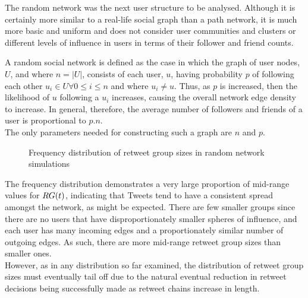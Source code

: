 The random network was the next user structure to be analysed. Although it is certainly more similar to a real-life social graph than a path network, it is much more basic and uniform and does not consider user communities and clusters or different levels of influence in users in terms of their follower and friend counts.

A random social network is defined as the case in which the graph of user nodes, $U$, and where $n = |U|$, consists of each user, $u$, having probability $p$ of following each other $u_i \in U \forall 0 \leq i \leq n$ and where $u_i \neq u$. Thus, as $p$ is increased, then the likelihood of $u$ following a $u_i$ increases, causing the overall network edge density to increase. In general, therefore, the average number of followers and friends of a user is proportional to $p.n$.\\
The only parameters needed for constructing such a graph are $n$ and $p$.

\begin{figure}[h]
\centering
{}
\caption{Frequency distribution of retweet group sizes in random network simulations}
\label{fig:random}
\end{figure}

The frequency distribution demonstrates a very large proportion of mid-range values for $RG(t)$, indicating that Tweets tend to have a consistent spread amongst the network, as might be expected. There are few smaller groups since there are no users that have disproportionately smaller spheres of influence, and each user has many incoming edges and a proportionately similar number of outgoing edges. As such, there are more mid-range retweet group sizes than smaller ones.\\
However, as in any distribution so far examined, the distribution of retweet group sizes must eventually tail off due to the natural eventual reduction in retweet decisions being successfully made as retweet chains increase in length.


